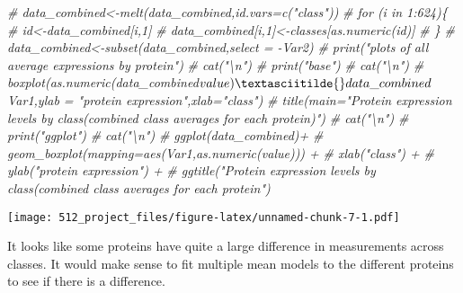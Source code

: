 \documentclass[
]{article}
\newenvironment{Shaded}{\begin{snugshade}}{\end{snugshade}}
\newcommand{\CommentTok}[1]{\textcolor[rgb]{0.56,0.35,0.01}{\textit{#1}}}
\newcommand{\DocumentationTok}[1]{\textcolor[rgb]{0.56,0.35,0.01}{\textbf{\textit{#1}}}}
\begin{document}
\begin{Shaded}
\end{Shaded}

\begin{Shaded}
\begin{Highlighting}[]
\CommentTok{\# data\_combined\textless{}{-}melt(data\_combined,id.vars=c("class"))}
\CommentTok{\# for (i in 1:624)\{}
\CommentTok{\#   id\textless{}{-}data\_combined[i,1]}
\CommentTok{\#   data\_combined[i,1]\textless{}{-}classes[as.numeric(id)]}
\CommentTok{\# \}}
\CommentTok{\# data\_combined\textless{}{-}subset(data\_combined,select = {-}Var2)}
\CommentTok{\# print("plots of all average expressions by protein")}
\CommentTok{\# cat("\textbackslash{}n")}
\CommentTok{\# print("base")}
\CommentTok{\# cat("\textbackslash{}n")}
\CommentTok{\# boxplot(as.numeric(data\_combined$value)\textasciitilde{}data\_combined$Var1,ylab = "protein expression",xlab="class")}
\CommentTok{\# title(main="Protein expression levels by class(combined class averages for each protein)")}
\CommentTok{\# cat("\textbackslash{}n")}
\CommentTok{\# print("ggplot")}
\CommentTok{\# cat("\textbackslash{}n")}
\CommentTok{\# ggplot(data\_combined)+}
\CommentTok{\#   geom\_boxplot(mapping=aes(Var1,as.numeric(value))) +}
\CommentTok{\#   xlab("class") +}
\CommentTok{\#   ylab("protein expression") +}
\CommentTok{\#   ggtitle("Protein expression levels by class(combined class averages for each protein")}
\end{Highlighting}
\end{Shaded}

\texttt{[image: 512\_project\_files/figure-latex/unnamed-chunk-7-1.pdf]}

It looks like some proteins have quite a large difference in
measurements across classes. It would make sense to fit multiple mean
models to the different proteins to see if there is a difference.
\end{document}
